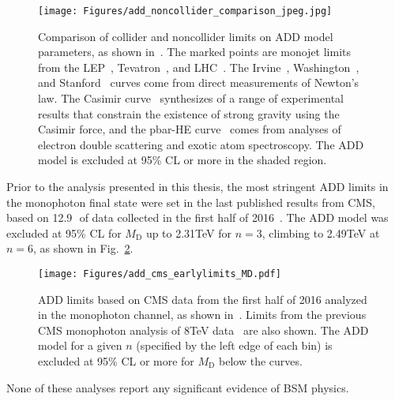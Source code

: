\begin{figure}[hbtp]
  \begin{center}
    \texttt{[image: Figures/add\_noncollider\_comparison\_jpeg.jpg]}
    \caption{
      Comparison of collider and noncollider limits on ADD model parameters, as shown in~\cite{ref:0264-9381/32/3/033001}.
      The marked points are monojet limits from the LEP~\cite{ref:9789812702227_0266}, Tevatron~\cite{ref:PhysRevLett.101.181602}, and LHC~\cite{ref:j.physletb.2011.10.006, ref:PhysRevLett.110.011802, ref:0264-9381/32/3/033001}.
      The Irvine~\cite{ref:PhysRevD.32.3084, ref:PhysRevLett.44.1645}, Washington~\cite{ref:PhysRevLett.98.021101}, and Stanford~\cite{ref:PhysRevD.78.022002} curves come from direct measurements of Newton's law.
      The Casimir curve~\cite{ref:0264-9381/32/3/033001} synthesizes of a range of  experimental results that constrain the existence of strong gravity using the Casimir force,
      and the pbar-HE curve~\cite{ref:epjconf/20146605021, ref:0264-9381/32/3/033001} comes from analyses of electron double scattering and exotic atom spectroscopy.
      The ADD model is excluded at 95\% CL or more in the shaded region.
    }
    \label{fig:add_noncollider_comparison}
  \end{center}
\end{figure}

Prior to the analysis presented in this thesis, the most stringent ADD limits in the monophoton final state were set in the last published results from CMS,
based on 12.9\,\fbinv\ of data collected in the first half of 2016~\cite{ref:JHEP10(2017)073}. The ADD model was excluded at 95\% CL for $M_\mathrm{D}$ up to 2.31\unit{TeV}
for $n = 3$, climbing to 2.49\unit{TeV} at $n = 6$, as shown in Fig.~\ref{fig:add_cms_earlylimits_MD}.

\begin{figure}[hbtp]
  \begin{center}
    \texttt{[image: Figures/add\_cms\_earlylimits\_MD.pdf]}
    \caption{
    ADD limits based on CMS data from the first half of 2016 analyzed in the monophoton channel, as shown in~\cite{ref:JHEP10(2017)073}.
    Limits from the previous CMS monophoton analysis of 8\unit{TeV} data~\cite{ref:j.physletb.2016.01.057} are also shown.
    The ADD model for a given $n$ (specified by the left edge of each bin) is excluded at 95\% CL or more for $M_\mathrm{D}$ below the curves.
    }
    \label{fig:add_cms_earlylimits_MD}
  \end{center}
\end{figure}

None of these analyses report any significant evidence of BSM physics.
